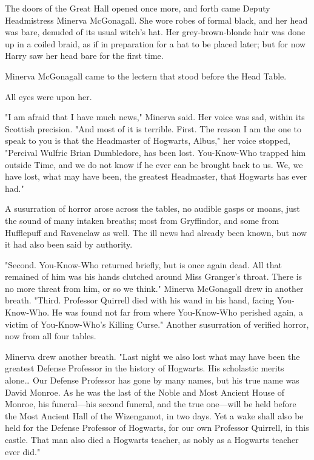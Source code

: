 The doors of the Great Hall opened once more, and forth came Deputy
Headmistress Minerva McGonagall. She wore robes of formal black, and her head
was bare, denuded of its usual witch's hat. Her grey-brown-blonde hair was done
up in a coiled braid, as if in preparation for a hat to be placed later; but
for now Harry saw her head bare for the first time.

Minerva McGonagall came to the lectern that stood before the Head Table.

All eyes were upon her.

"I am afraid that I have much news," Minerva said. Her voice was sad, within
its Scottish precision. "And most of it is terrible. First. The reason I am the
one to speak to you is that the Headmaster of Hogwarts, Albus," her voice
stopped, "Percival Wulfric Brian Dumbledore, has been lost. You-Know-Who
trapped him outside Time, and we do not know if he ever can be brought back to
us. We, we have lost, what may have been, the greatest Headmaster, that
Hogwarts has ever had."

A susurration of horror arose across the tables, no audible gasps or moans,
just the sound of many intaken breaths; most from Gryffindor, and some from
Hufflepuff and Ravenclaw as well. The ill news had already been known, but now
it had also been said by authority.

"Second. You-Know-Who returned briefly, but is once again dead. All that
remained of him was his hands clutched around Miss Granger's throat. There is
no more threat from him, or so we think." Minerva McGonagall drew in another
breath. "Third. Professor Quirrell died with his wand in his hand, facing
You-Know-Who. He was found not far from where You-Know-Who perished again, a
victim of You-Know-Who's Killing Curse." Another susurration of verified
horror, now from all four tables.

Minerva drew another breath. "Last night we also lost what may have been the
greatest Defense Professor in the history of Hogwarts. His scholastic merits
alone{\ldots} Our Defense Professor has gone by many names, but his true name
was David Monroe. As he was the last of the Noble and Most Ancient House of
Monroe, his funeral---his second funeral, and the true one---will be held
before the Most Ancient Hall of the Wizengamot, in two days. Yet a wake shall
also be held for the Defense Professor of Hogwarts, for our own Professor
Quirrell, in this castle. That man also died a Hogwarts teacher, as nobly as a
Hogwarts teacher ever did."

